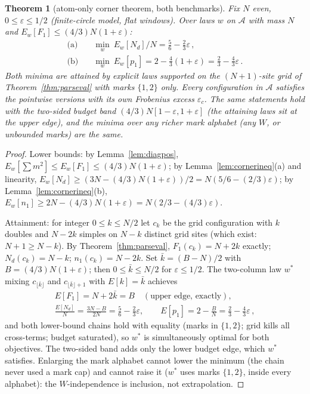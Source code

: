 \documentclass[11pt]{article}
\theoremstyle{plain}
\newtheorem{theorem}{Theorem}[section]
\theoremstyle{definition}
\theoremstyle{remark}
\newcommand{\Nd}{N_{d}}
\begin{document}
\begin{theorem}[atom-only corner theorem, both benchmarks]
\label{thm:corner}
Fix $N$ even, $0 \le \varepsilon \le 1/2$ (finite-circle model, flat windows).
Over laws $w$ on $\mathcal{A}$ with mass $N$ and
$E_w[F_1] \le (4/3) N (1 + \varepsilon)$:
\begin{align*}
  \text{(a)} \quad &\min_w\ E_w[\Nd]/N = \frac{5}{6} - \frac{2}{3}\varepsilon \,,\\
  \text{(b)} \quad &\min_w\ E_w[p_1] = 2 - \frac{4}{3}(1 + \varepsilon)
    = \frac{2}{3} - \frac{4}{3}\varepsilon \,.
\end{align*}
Both minima are attained by explicit laws supported on the $(N+1)$-site grid of
Theorem~\ref{thm:parseval} with marks $\{1, 2\}$ only. Every configuration in
$\mathcal{A}$ satisfies the pointwise versions with its own Frobenius excess
$\varepsilon_c$. The same statements hold with the two-sided budget band
$(4/3) N [1 - \varepsilon, 1 + \varepsilon]$ (the attaining laws sit at the upper
edge), and the minima over any richer mark alphabet (any $W$, or unbounded marks)
are the same.
\end{theorem}

\begin{proof}
Lower bounds: by Lemma~\ref{lem:diagpos},
$E_w[\sum m^2] \le E_w[F_1] \le (4/3) N (1 + \varepsilon)$; by
Lemma~\ref{lem:cornerineq}(a) and linearity,
$E_w[\Nd] \ge (3N - (4/3)N(1 + \varepsilon))/2
 = N(5/6 - (2/3)\varepsilon)$; by Lemma~\ref{lem:cornerineq}(b),
$E_w[n_1] \ge 2N - (4/3)N(1 + \varepsilon) = N(2/3 - (4/3)\varepsilon)$.

Attainment: for integer $0 \le k \le N/2$ let $c_k$ be the grid configuration
with $k$ doubles and $N - 2k$ simples on $N - k$ distinct grid sites (which
exist: $N + 1 \ge N - k$). By Theorem~\ref{thm:parseval},
$F_1(c_k) = N + 2k$ exactly; $\Nd(c_k) = N - k$; $n_1(c_k) = N - 2k$. Set
$\bar{k} = (B - N)/2$ with $B = (4/3)N(1 + \varepsilon)$; then
$0 \le \bar{k} \le N/2$ for $\varepsilon \le 1/2$. The two-column law $w^*$
mixing $c_{\lfloor \bar{k} \rfloor}$ and $c_{\lfloor \bar{k} \rfloor + 1}$ with
$E[k] = \bar{k}$ achieves
\begin{gather*}
  E[F_1] = N + 2\bar{k} = B \quad (\text{upper edge, exactly}),\\
  \frac{E[\Nd]}{N} = \frac{3N - B}{2N} = \frac{5}{6} - \frac{2}{3}\varepsilon,
  \qquad
  E[p_1] = 2 - \frac{B}{N} = \frac{2}{3} - \frac{4}{3}\varepsilon \,,
\end{gather*}
and both lower-bound chains hold with equality (marks in $\{1, 2\}$; grid kills
all cross-terms; budget saturated), so $w^*$ is simultaneously optimal for both
objectives. The two-sided band adds only the lower budget edge, which $w^*$
satisfies. Enlarging the mark alphabet cannot lower the minimum (the chain never
used a mark cap) and cannot raise it ($w^*$ uses marks $\{1, 2\}$, inside every
alphabet): the $W$-independence is inclusion, not extrapolation.
\end{proof}
\end{document}
